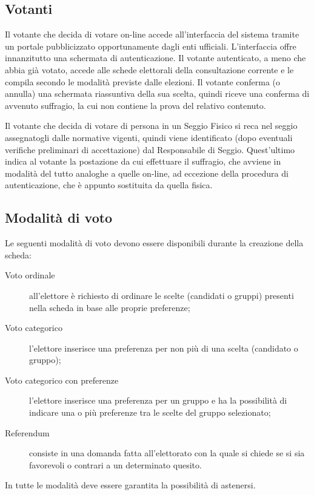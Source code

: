 \documentclass{report}
\begin{document}
\subsection{Votanti}
Il votante che decida di votare on-line accede all'interfaccia del sistema tramite un portale pubblicizzato opportunamente dagli enti ufficiali. L'interfaccia offre innanzitutto una schermata di autenticazione. Il votante autenticato, a meno che abbia già votato, accede alle schede elettorali della consultazione corrente e le compila secondo le modalità previste dalle elezioni. Il votante conferma (o annulla) una schermata riassuntiva della sua scelta, quindi riceve una conferma di avvenuto suffragio, la cui non contiene la prova del relativo contenuto.

Il votante che decida di votare di persona in un Seggio Fisico si reca nel seggio assegnatogli dalle normative vigenti, quindi viene identificato (dopo eventuali verifiche preliminari di accettazione) dal Responsabile di Seggio. Quest'ultimo indica al votante la postazione da cui effettuare il suffragio, che avviene in modalità del tutto analoghe a quelle on-line, ad eccezione della procedura di autenticazione, che è appunto sostituita da quella fisica.


\subsection{Modalità di voto}
Le seguenti modalità di voto devono essere disponibili durante la creazione della scheda:
\begin{description}
	\item[Voto ordinale] all'elettore è richiesto di ordinare le scelte (candidati o gruppi) presenti nella scheda in base alle proprie preferenze;
	\item[Voto categorico] l'elettore inserisce una preferenza per non più di una scelta (candidato o gruppo);
	\item[Voto categorico con preferenze] l'elettore inserisce una preferenza per un gruppo e ha la possibilità di indicare una o più preferenze tra le scelte del gruppo selezionato;
	\item[Referendum] consiste in una domanda fatta all'elettorato con la quale si chiede se si sia favorevoli o contrari a un determinato quesito.
\end{description}

In tutte le modalità deve essere garantita la possibilità di astenersi.
\end{document}
